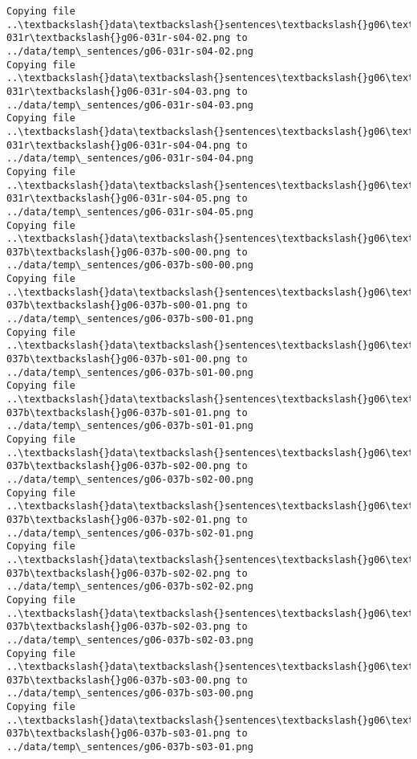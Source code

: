 \documentclass[11pt]{article}
\begin{document}
\begin{Verbatim}[commandchars=\\\{\}]
Copying file ..\textbackslash{}data\textbackslash{}sentences\textbackslash{}g06\textbackslash{}g06-031r\textbackslash{}g06-031r-s04-02.png to
../data/temp\_sentences/g06-031r-s04-02.png
Copying file ..\textbackslash{}data\textbackslash{}sentences\textbackslash{}g06\textbackslash{}g06-031r\textbackslash{}g06-031r-s04-03.png to
../data/temp\_sentences/g06-031r-s04-03.png
Copying file ..\textbackslash{}data\textbackslash{}sentences\textbackslash{}g06\textbackslash{}g06-031r\textbackslash{}g06-031r-s04-04.png to
../data/temp\_sentences/g06-031r-s04-04.png
Copying file ..\textbackslash{}data\textbackslash{}sentences\textbackslash{}g06\textbackslash{}g06-031r\textbackslash{}g06-031r-s04-05.png to
../data/temp\_sentences/g06-031r-s04-05.png
Copying file ..\textbackslash{}data\textbackslash{}sentences\textbackslash{}g06\textbackslash{}g06-037b\textbackslash{}g06-037b-s00-00.png to
../data/temp\_sentences/g06-037b-s00-00.png
Copying file ..\textbackslash{}data\textbackslash{}sentences\textbackslash{}g06\textbackslash{}g06-037b\textbackslash{}g06-037b-s00-01.png to
../data/temp\_sentences/g06-037b-s00-01.png
Copying file ..\textbackslash{}data\textbackslash{}sentences\textbackslash{}g06\textbackslash{}g06-037b\textbackslash{}g06-037b-s01-00.png to
../data/temp\_sentences/g06-037b-s01-00.png
Copying file ..\textbackslash{}data\textbackslash{}sentences\textbackslash{}g06\textbackslash{}g06-037b\textbackslash{}g06-037b-s01-01.png to
../data/temp\_sentences/g06-037b-s01-01.png
Copying file ..\textbackslash{}data\textbackslash{}sentences\textbackslash{}g06\textbackslash{}g06-037b\textbackslash{}g06-037b-s02-00.png to
../data/temp\_sentences/g06-037b-s02-00.png
Copying file ..\textbackslash{}data\textbackslash{}sentences\textbackslash{}g06\textbackslash{}g06-037b\textbackslash{}g06-037b-s02-01.png to
../data/temp\_sentences/g06-037b-s02-01.png
Copying file ..\textbackslash{}data\textbackslash{}sentences\textbackslash{}g06\textbackslash{}g06-037b\textbackslash{}g06-037b-s02-02.png to
../data/temp\_sentences/g06-037b-s02-02.png
Copying file ..\textbackslash{}data\textbackslash{}sentences\textbackslash{}g06\textbackslash{}g06-037b\textbackslash{}g06-037b-s02-03.png to
../data/temp\_sentences/g06-037b-s02-03.png
Copying file ..\textbackslash{}data\textbackslash{}sentences\textbackslash{}g06\textbackslash{}g06-037b\textbackslash{}g06-037b-s03-00.png to
../data/temp\_sentences/g06-037b-s03-00.png
Copying file ..\textbackslash{}data\textbackslash{}sentences\textbackslash{}g06\textbackslash{}g06-037b\textbackslash{}g06-037b-s03-01.png to
../data/temp\_sentences/g06-037b-s03-01.png

\end{Verbatim}
\end{document}

